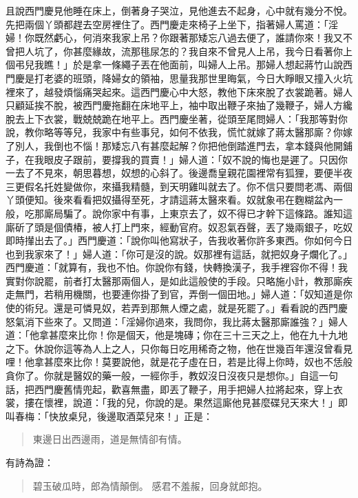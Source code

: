 且說西門慶見他睡在床上，倒著身子哭泣，見他進去不起身，心中就有幾分不悅。先把兩個丫頭都趕去空房裡住了。西門慶走來椅子上坐下，指著婦人罵道：「淫婦！你既然虧心，何消來我家上吊？你跟著那矮忘八過去便了，誰請你來！我又不曾把人坑了，你甚麼緣故，流那毴尿怎的？我自來不曾見人上吊，我今日看著你上個弔兒我瞧！」於是拿一條繩子丟在他面前，叫婦人上吊。那婦人想起蔣竹山說西門慶是打老婆的班頭，降婦女的領袖，思量我那世里晦氣，今日大睜眼又撞入火坑裡來了，越發煩惱痛哭起來。這西門慶心中大怒，教他下床來脫了衣裳跪著。婦人只顧延挨不脫，被西門慶拖翻在床地平上，袖中取出鞭子來抽了幾鞭子，婦人方纔脫去上下衣裳，戰兢兢跪在地平上。西門慶坐著，從頭至尾問婦人：「我那等對你說，教你略等等兒，我家中有些事兒，如何不依我，慌忙就嫁了蔣太醫那廝？你嫁了別人，我倒也不惱！那矮忘八有甚麼起解？你把他倒踏進門去，拿本錢與他開鋪子，在我眼皮子跟前，要撐我的買賣！」婦人道：「奴不說的悔也是遲了。只因你一去了不見來，朝思暮想，奴想的心斜了。後邊喬皇親花園裡常有狐狸，要便半夜三更假名托姓變做你，來攝我精髓，到天明雞叫就去了。你不信只要問老馮、兩個丫頭便知。後來看看把奴攝得至死，才請這蔣太醫來看。奴就象弔在麴糊盆內一般，吃那廝局騙了。說你家中有事，上東京去了，奴不得已才幹下這條路。誰知這廝斫了頭是個債椿，被人打上門來，經動官府。奴忍氣吞聲，丟了幾兩銀子，吃奴即時攆出去了。」西門慶道：「說你叫他寫狀子，告我收著你許多東西。你如何今日也到我家來了！」婦人道：「你可是沒的說。奴那裡有這話，就把奴身子爛化了。」西門慶道：「就算有，我也不怕。你說你有錢，快轉換漢子，我手裡容你不得！我實對你說罷，前者打太醫那兩個人，是如此這般使的手段。只略施小計，教那廝疾走無門，若稍用機關，也要連你掛了到官，弄倒一個田地。」婦人道：「奴知道是你使的術兒。還是可憐見奴，若弄到那無人煙之處，就是死罷了。」看看說的西門慶怒氣消下些來了。又問道：「淫婦你過來，我問你，我比蔣太醫那廝誰強？」婦人道：「他拿甚麼來比你！你是個天，他是塊磚；你在三十三天之上，他在九十九地之下。休說你這等為人上之人，只你每日吃用稀奇之物，他在世幾百年還沒曾看見哩！他拿甚麼來比你！莫要說他，就是花子虛在日，若是比得上你時，奴也不恁般貪你了。你就是醫奴的藥一般，一經你手，教奴沒日沒夜只是想你。」自這一句話，把西門慶舊情兜起，歡喜無盡，即丟了鞭子，用手把婦人拉將起來，穿上衣裳，摟在懷裡，說道：「我的兒，你說的是。果然這廝他見甚麼碟兒天來大！」即叫春梅：「快放桌兒，後邊取酒菜兒來！」正是：
\begin{quote}
東邊日出西邊雨，道是無情卻有情。
\end{quote}
有詩為證：
\begin{quote}
碧玉破瓜時，郎為情顛倒。
感君不羞赧，回身就郎抱。
\end{quote}
